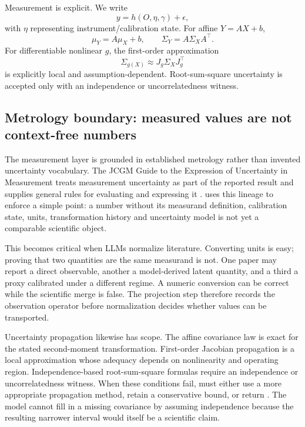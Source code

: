 Measurement is explicit. We write
\begin{equation}y=h(O,\eta,\gamma)+\epsilon,\end{equation}
with $\eta$ representing instrument/calibration state. For affine $Y=AX+b$,
\begin{equation}\mu_Y=A\mu_X+b,\qquad \Sigma_Y=A\Sigma_XA^\top.\end{equation}
For differentiable nonlinear $g$, the first-order approximation
\begin{equation}\Sigma_{g(X)}\approx J_g\Sigma_XJ_g^\top\end{equation}
is explicitly local and assumption-dependent. Root-sum-square uncertainty is accepted only with an independence or uncorrelatedness witness.

\subsection{Metrology boundary: measured values are not context-free numbers}

The measurement layer is grounded in established metrology rather than invented uncertainty vocabulary. The JCGM Guide to the Expression of Uncertainty in Measurement treats measurement uncertainty as part of the reported result and supplies general rules for evaluating and expressing it \cite{jcgm2008}. \RAKL{} uses this lineage to enforce a simple point: a number without its measurand definition, calibration state, units, transformation history and uncertainty model is not yet a comparable scientific object.

This becomes critical when LLMs normalize literature. Converting units is easy; proving that two quantities are the same measurand is not. One paper may report a direct observable, another a model-derived latent quantity, and a third a proxy calibrated under a different regime. A numeric conversion can be correct while the scientific merge is false. The projection step therefore records the observation operator before normalization decides whether values can be transported.

Uncertainty propagation likewise has scope. The affine covariance law is exact for the stated second-moment transformation. First-order Jacobian propagation is a local approximation whose adequacy depends on nonlinearity and operating region. Independence-based root-sum-square formulas require an independence or uncorrelatedness witness. When these conditions fail, \RAKL{} must either use a more appropriate propagation method, retain a conservative bound, or return \CannotCheck{}. The model cannot fill in a missing covariance by assuming independence because the resulting narrower interval would itself be a scientific claim.
